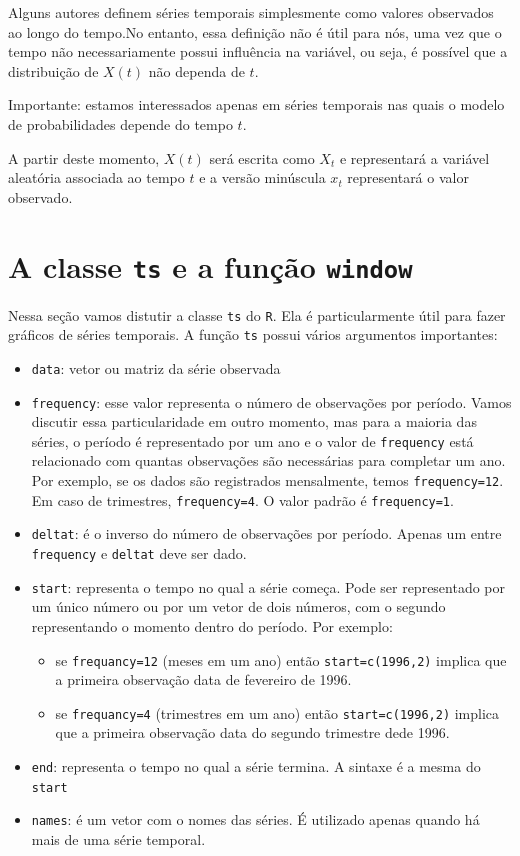 \documentclass[
  letterpaper,
  DIV=11,
  numbers=noendperiod]{scrreprt}
\begin{document}
Alguns autores definem séries temporais simplesmente como valores
observados ao longo do tempo.No entanto, essa definição não é útil para
nós, uma vez que o tempo não necessariamente possui influência na
variável, ou seja, é possível que a distribuição de \(X(t)\) não dependa
de \(t\).

Importante: estamos interessados apenas em séries temporais nas quais o
modelo de probabilidades depende do tempo \(t\).

A partir deste momento, \(X(t)\) será escrita como \(X_t\) e
representará a variável aleatória associada ao tempo \(t\) e a versão
minúscula \(x_t\) representará o valor observado.

\section{\texorpdfstring{A classe \texttt{ts} e a função
\texttt{window}}{A classe ts e a função window}}\label{a-classe-ts-e-a-funuxe7uxe3o-window}

Nessa seção vamos distutir a classe \texttt{ts} do \texttt{R}. Ela é
particularmente útil para fazer gráficos de séries temporais. A função
\texttt{ts} possui vários argumentos importantes:

\begin{itemize}
\item
  \texttt{data}: vetor ou matriz da série observada
\item
  \texttt{frequency}: esse valor representa o número de observações por
  período. Vamos discutir essa particularidade em outro momento, mas
  para a maioria das séries, o período é representado por um ano e o
  valor de \texttt{frequency} está relacionado com quantas observações
  são necessárias para completar um ano. Por exemplo, se os dados são
  registrados mensalmente, temos \texttt{frequency=12}. Em caso de
  trimestres, \texttt{frequency=4}. O valor padrão é
  \texttt{frequency=1}.
\item
  \texttt{deltat}: é o inverso do número de observações por período.
  Apenas um entre \texttt{frequency} e \texttt{deltat} deve ser dado.
\item
  \texttt{start}: representa o tempo no qual a série começa. Pode ser
  representado por um único número ou por um vetor de dois números, com
  o segundo representando o momento dentro do período. Por exemplo:

  \begin{itemize}
  \item
    se \texttt{frequancy=12} (meses em um ano) então
    \texttt{start=c(1996,2)} implica que a primeira observação data de
    fevereiro de 1996.
  \item
    se \texttt{frequancy=4} (trimestres em um ano) então
    \texttt{start=c(1996,2)} implica que a primeira observação data do
    segundo trimestre dede 1996.
  \end{itemize}
\item
  \texttt{end}: representa o tempo no qual a série termina. A sintaxe é
  a mesma do \texttt{start}
\item
  \texttt{names}: é um vetor com o nomes das séries. É utilizado apenas
  quando há mais de uma série temporal.
\end{itemize}
\end{document}
